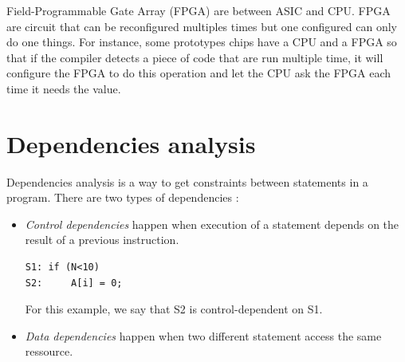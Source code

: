 Field-Programmable Gate Array (FPGA) are between ASIC and CPU. FPGA are circuit that can be reconfigured multiples times but one configured can only do one things. For instance, some prototypes chips have a CPU and a FPGA so that if the compiler detects a piece of code that are run multiple time, it will configure the FPGA to do this operation and let the CPU ask the FPGA each time it needs the value.  

\section{Dependencies analysis}
Dependencies analysis is a way to get constraints between statements in a program. There are two types of dependencies :
\begin{itemize}
\item \emph{Control dependencies} happen when execution of a statement depends on the result of a previous instruction. 
\begin{lstlisting}[frame=single]
S1: if (N<10)
S2:     A[i] = 0;
\end{lstlisting}

For this example, we say that S2 is control-dependent on S1.


\item \emph{Data dependencies} happen when two different statement access the same ressource.
\end{itemize}

